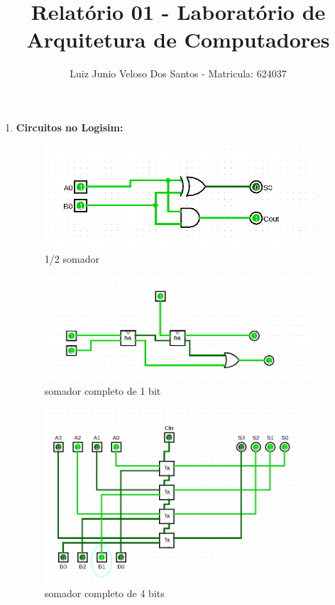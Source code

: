 \documentclass[a4paper,11pt]{article}
\title{\vspace{-4cm}Relatório 01 - Laboratório de Arquitetura de Computadores}
\author{Luiz Junio Veloso Dos Santos - Matricula: 624037}
\begin{document}
 

\maketitle

\begin{enumerate}
    \item \textbf{Circuitos no Logisim:}
        \begin{figure}[ht]
            \caption{1/2 somador}
            \centering
            \includegraphics[width=10cm]{logisim-halfadder}
        \end{figure}                                                      
        \begin{figure}[ht]
            \vspace{-1cm}
            \caption{somador completo de 1 bit}
            \centering
            \includegraphics[width=10cm]{logisim-fulladder}
        \end{figure}                                                     
        \begin{figure}[ht]
            \vspace{-1cm}
            \caption{somador completo de 4 bits}
            \centering
            \includegraphics[width=10cm]{logisim-fulladder4}

\end{figure}
\end{enumerate}
\end{document}
